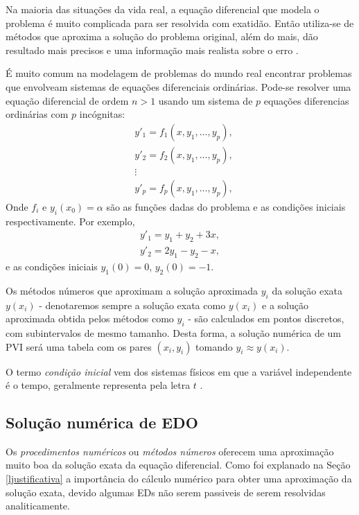 Na maioria das situações da vida real, a equação diferencial que modela o problema
é muito complicada para ser resolvida com exatidão. Então utiliza-se de métodos que
aproxima a solução do problema original, além do mais, dão resultado mais precisos e
uma informação mais realista sobre o erro \cite{faires}.

É muito comum na modelagem de problemas do mundo real encontrar problemas que envolveam
sistemas de equações diferenciais ordinárias. Pode-se resolver uma equação
diferencial de ordem $n > 1$ usando um sistema de $p$ equações diferencias
ordinárias com $p$ incógnitas:
\begin{equation*}
\begin{aligned}
&y'_{1} = f_{1}(x,y_{1},\dotsc,y_{p}),\\
&y'_{2} = f_{2}(x,y_{1},\dotsc,y_{p}),\\
&\vdots \\
&y'_{p} = f_{p}(x,y_{1},\dotsc,y_{p}),
\end{aligned}
\end{equation*}
Onde $f_{i}$ e $y_{i}(x_{0}) = \alpha$ são as funções dadas do problema e as condições
iniciais respectivamente. Por exemplo,
\begin{equation*}
\begin{split}
y'_{1} = y_{1} + y_{2} + 3x, \\
y'_{2} = 2y_{1} - y_{2} -x,
\end{split}
\end{equation*}
e as condições iniciais $y_{1}(0) = 0$, $y_{2}(0) = -1$.

Os métodos números que aproximam a solução aproximada $y_{i}$ da solução exata $y(x_{i})$ - 
denotaremos sempre a solução exata como $y(x_{i})$ e a solução aproximada obtida pelos 
métodos como  $y_{i}$ - são calculados em pontos discretos, com subintervalos de mesmo tamanho.
Desta forma, a solução numérica de um PVI será uma tabela com os pares $(x_{i},y_{i})$
tomando $y_{i} \approx y(x_{i})$.

O termo \emph{condição inicial} vem dos sistemas físicos em que a variável independente
é o tempo, geralmente representa pela letra $t$ \cite{zill2003equacoes}.

\subsection{Solução numérica de EDO}
Os \emph{procedimentos numéricos} ou \emph{métodos números} oferecem uma aproximação muito
boa da solução exata da equação diferencial. Como foi explanado na Seção
\ref{ljustificativa} a importância do cálculo numérico para obter uma aproximação
da solução exata, devido algumas EDs não serem passiveis de serem resolvidas analiticamente.

